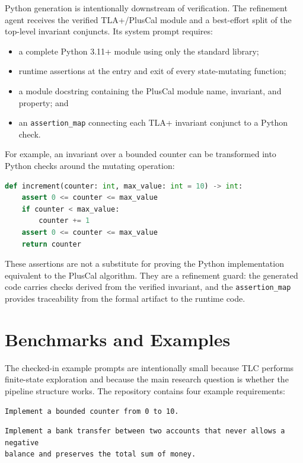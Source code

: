 \documentclass[11pt]{article}
\begin{document}
Python generation is intentionally downstream of verification. The refinement
agent receives the verified TLA+/PlusCal module and a best-effort split of the
top-level invariant conjuncts. Its system prompt requires:

\begin{itemize}[leftmargin=*]
  \item a complete Python 3.11+ module using only the standard library;
  \item runtime assertions at the entry and exit of every state-mutating
  function;
  \item a module docstring containing the PlusCal module name, invariant, and
  property; and
  \item an \texttt{assertion\_map} connecting each TLA+ invariant conjunct to a
  Python check.
\end{itemize}

For example, an invariant over a bounded counter can be transformed into
Python checks around the mutating operation:

\begin{lstlisting}[language=Python]
def increment(counter: int, max_value: int = 10) -> int:
    assert 0 <= counter <= max_value
    if counter < max_value:
        counter += 1
    assert 0 <= counter <= max_value
    return counter
\end{lstlisting}

These assertions are not a substitute for proving the Python implementation
equivalent to the PlusCal algorithm. They are a refinement guard: the generated
code carries checks derived from the verified invariant, and the
\texttt{assertion\_map} provides traceability from the formal artifact to the
runtime code.

\section{Benchmarks and Examples}

The checked-in example prompts are intentionally small because TLC performs
finite-state exploration and because the main research question is whether the
pipeline structure works. The repository contains four example requirements:

\begin{lstlisting}
Implement a bounded counter from 0 to 10.
\end{lstlisting}

\begin{lstlisting}
Implement a bank transfer between two accounts that never allows a negative
balance and preserves the total sum of money.
\end{lstlisting}
\end{document}

